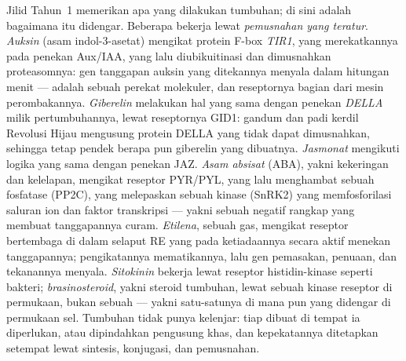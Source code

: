 \begin{definition}\label{def:b3:plant-molecular-physiology:hormones}
%
Jilid Tahun~1 memerikan apa yang dilakukan  tumbuhan; di sini adalah bagaimana
 itu didengar. Beberapa bekerja lewat \emph{pemusnahan yang teratur}.
\emph{Auksin} (asam indol-3-asetat) mengikat protein F-box
\emph{TIR1}, yang merekatkannya pada penekan Aux/IAA, yang lalu
diubikuitinasi dan dimusnahkan proteasomnya: gen tanggapan auksin
yang ditekannya menyala dalam hitungan menit ---  adalah sebuah
perekat molekuler, dan reseptornya bagian dari mesin perombakannya.
\emph{Giberelin} melakukan hal yang sama dengan penekan \emph{DELLA} milik
pertumbuhannya, lewat reseptornya GID1: gandum dan padi kerdil
Revolusi Hijau mengusung protein DELLA yang tidak dapat dimusnahkan, sehingga
tetap pendek berapa pun giberelin yang dibuatnya. \emph{Jasmonat}
mengikuti logika yang sama dengan penekan JAZ. \emph{Asam absisat}
(ABA), yakni  kekeringan dan kelelapan, mengikat reseptor PYR/PYL,
yang lalu menghambat sebuah fosfatase (PP2C), yang melepaskan sebuah kinase
(SnRK2) yang memfosforilasi saluran ion dan faktor transkripsi ---
yakni sebuah negatif rangkap yang membuat tanggapannya curam. \emph{Etilena}, sebuah
gas, mengikat reseptor bertembaga di dalam selaput RE yang pada ketiadaannya
secara aktif menekan tanggapannya; pengikatannya mematikannya, lalu
gen pemasakan, penuaan, dan tekanannya menyala. \emph{Sitokinin}
bekerja lewat reseptor histidin-kinase seperti 
bakteri; \emph{brasinosteroid}, yakni steroid tumbuhan, lewat
sebuah kinase reseptor di permukaan, bukan sebuah  --- yakni satu-satunya  di mana pun yang didengar di permukaan sel. Tumbuhan tidak punya kelenjar: tiap
 dibuat di tempat ia diperlukan, atau dipindahkan pengusung khas, dan
kepekatannya ditetapkan setempat lewat sintesis, konjugasi, dan
pemusnahan.
\end{definition}

